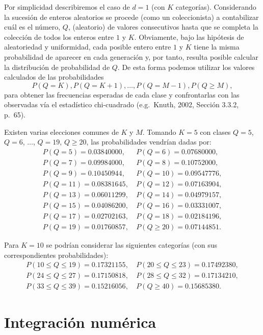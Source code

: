 \documentclass[
]{book}
\theoremstyle{break}
\theoremstyle{nonumberplain}
\begin{document}
Por simplicidad describiremos el caso de \(d=1\) (con \(K\) categorías).
Considerando la sucesión de enteros aleatorios se procede (como un
coleccionista) a contabilizar cuál es el número, \(Q\), (aleatorio) de
valores consecutivos hasta que se completa la colección de todos los
enteros entre \(1\) y \(K\). Obviamente, bajo las hipótesis de aleatoriedad
y uniformidad, cada posible entero entre \(1\) y
\(K\) tiene la misma probabilidad de aparecer en cada generación y, por
tanto, resulta posible calcular la distribución de probabilidad de \(Q\).
De esta forma podemos utilizar los valores calculados de las probabilidades
\[P( Q = K ), P( Q = K+1 ),\ldots, P( Q = M -1 ), P( Q \geq M ),\]
para obtener las frecuencias esperadas de cada clase y confrontarlas con las
observadas vía el estadístico chi-cuadrado (e.g.~Knuth, 2002, Sección 3.3.2, p.~65).

Existen varias elecciones comunes de \(K\) y \(M\).
Tomando \(K=5\) con clases \(Q=5\), \(Q=6\), \(\ldots\), \(Q=19\), \(Q\geq20\), las probabilidades vendrían dadas por:
\[\begin{array}{rr}
P( Q = 5 ) = 0.03840000, \ & P( Q = 6 ) = 0.07680000,\\
P( Q = 7 ) = 0.09984000, \ & P( Q = 8 ) = 0.10752000,\\
P( Q = 9 ) = 0.10450944, \ & P( Q = 10 ) = 0.09547776,\\
P( Q = 11 ) = 0.08381645, \ & P( Q = 12 ) = 0.07163904,\\
P( Q = 13 ) = 0.06011299, \ & P( Q = 14 ) = 0.04979157,\\
P( Q = 15 ) = 0.04086200, \ & P( Q = 16 ) = 0.03331007,\\
P( Q = 17 ) = 0.02702163, \ & P( Q = 18 ) = 0.02184196,\\
P( Q = 19 ) = 0.01760857, \ & P( Q\geq20 ) = 0.07144851.
\end{array}\]

Para \(K=10\) se podrían considerar las siguientes categorías (con sus correspondientes probabilidades):
\[\begin{array}{rr}
P( 10 \leq Q \leq 19 ) = 0.17321155, \ & P( 20 \leq Q \leq 23 ) = 0.17492380,\\
P( 24 \leq Q \leq 27 ) = 0.17150818, \ & P( 28 \leq Q \leq 32 ) = 0.17134210,\\
P( 33 \leq Q \leq 39 ) = 0.15216056, \ & P( Q \geq 40 ) =0.15685380.
\end{array}\]

\hypertarget{int-num}{%
\chapter{Integración numérica}\label{int-num}}
\end{document}
